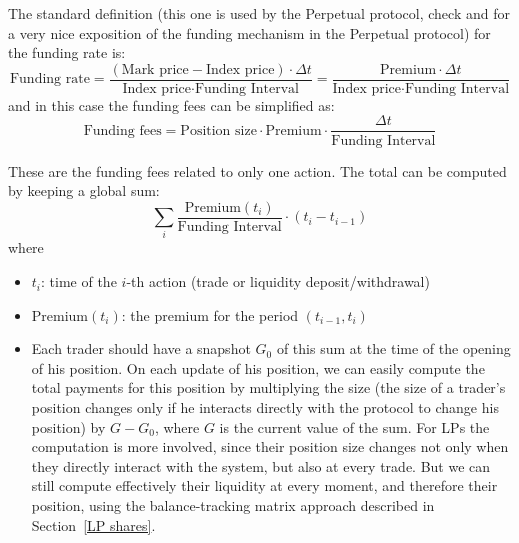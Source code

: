 \documentclass{article}
\begin{document}
The standard definition (this one is used by the Perpetual protocol, check \cite{perp1}
and \cite{perp2} for a very nice exposition of the funding mechanism in the Perpetual
protocol) for the funding rate is:
\begin{equation}
\text{Funding rate} = \frac{(\text{Mark price} - \text{Index price}) \cdot \Delta t}{\text{Index price} \cdot \text{Funding Interval}}
= \frac{\text{Premium} \cdot \Delta t}{\text{Index price} \cdot \text{Funding Interval}}
\end{equation}
and in this case the funding fees can be simplified as:
\begin{equation}\label{funding fees}
\text{Funding fees} = \text{Position size} \cdot \text{Premium} \cdot \frac{\Delta t}{\text{Funding Interval}}
\end{equation}

These are the funding fees related to only one action. The total can be computed by keeping
a global sum:
\begin{equation}\label{global sum}
\sum_i \frac{\text{Premium}(t_i)}{\text{Funding Interval}} \cdot (t_i - t_{i-1})
\end{equation}
where
\begin{itemize}
\item $t_i$: time of the $i$-th action (trade or liquidity deposit/withdrawal)
\item $\text{Premium}(t_i)$: the premium for the period $(t_{i-1}, t_i)$
\item Each trader should have a snapshot $G_0$ of this sum at the time of the opening of
      his position. On each update of his position, we can easily compute the total payments
      for this position by multiplying the size (the size of a trader's position changes
      only if he interacts directly with the protocol to change his position) by $G - G_0$,
      where $G$ is the current value of the sum. For LPs the computation is more involved,
      since their position size changes not only when they directly interact with the system,
      but also at every trade. But we can still compute effectively their liquidity at every
      moment, and therefore their position, using the balance-tracking matrix approach
      described in Section~\ref{LP shares}.
\end{itemize}
\end{document}

